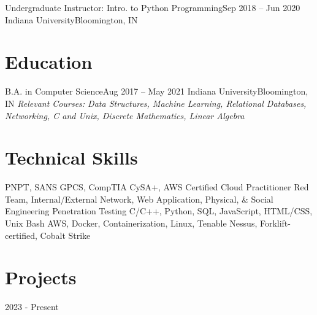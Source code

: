 \documentclass{resume}
\begin{document}
  \resumeEntryStart
    \resumeEntryTSDL
    {Undergraduate Instructor: Intro. to Python Programming}{Sep 2018 -- Jun 2020}
    {Indiana University}{Bloomington, IN}
    \resumeItemListStart
    \resumeItemListEnd
  \resumeEntryEnd

\section{Education}

  \resumeEntryStart
    \resumeEntryTSDL
    {B.A. in Computer Science}{Aug 2017 -- May 2021}
    {Indiana University}{Bloomington, IN}
      {\newline{}\newline{}\scriptsize \textit{ \footnotesize{Relevant Courses: Data Structures, Machine Learning, Relational Databases, Networking, C and Unix, Discrete Mathematics, Linear Algebra}}}
  \resumeEntryEnd

\section{Technical Skills}
 \resumeTechnicalEntryStart
   {PNPT, SANS GPCS, CompTIA CySA+, AWS Certified Cloud Practitioner}
   {Red Team, Internal/External Network, Web Application, Physical, \& Social Engineering Penetration Testing}
   {C/C++, Python, SQL, JavaScript, HTML/CSS, Unix Bash}
   {AWS, Docker, Containerization, Linux, Tenable Nessus, Forklift-certified, Cobalt Strike}
  \resumeTechnicalEntryEnd

\section{Projects}
  \resumeProjectEntryStart
    \resumeEntryTD
      {\scylla}{2023 - Present}
    \resumeItemListStart
    \resumeItemListEnd
  \resumeProjectEntryEnd 
  
\end{document}
